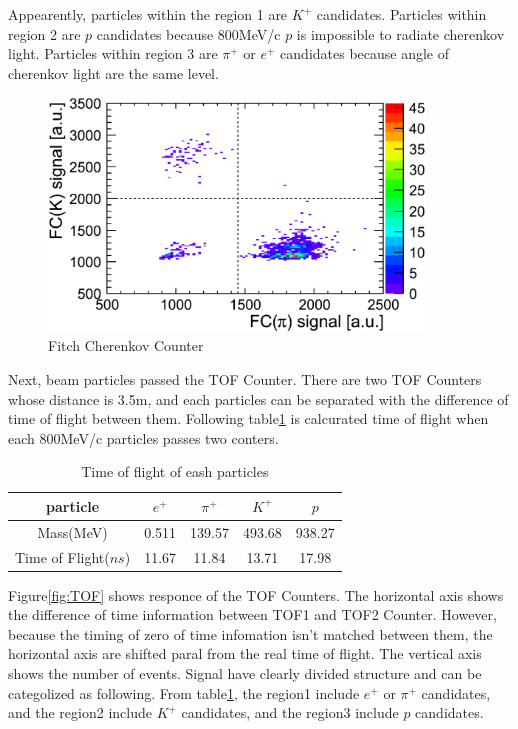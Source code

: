 Appearently, particles within the region 1 are $K^{+}$ candidates.
Particles within region 2 are $p$ candidates because 800MeV/c $p$ is impossible to radiate cherenkov light.
Particles within region 3 are $\pi^{+}$ or $e^{+}$ candidates because angle of cherenkov light are the same level.

\begin{figure}[htbp]
  \centering
  \includegraphics[width=10cm,clip]{fig/FC_KPI.eps}
  \caption{Fitch Cherenkov Counter}
  \label{fig:FC_KPI}
\end{figure}

Next, beam particles passed the TOF Counter.
There are two TOF Counters whose distance is 3.5m, 
and each particles can be separated with the difference of time of flight between them.
Following table\ref{tb:TOF_expect} is calcurated time of flight when each 800MeV/c particles passes two conters.\\

\begin{table}
  \centering
  \begin{tabular}[htb]{c|cccc}\hline
    particle & $e^{+}$ & $\pi^{+}$ & $K^{+}$ & $p$ \\ \hline
    Mass(MeV) & 0.511 & 139.57 & 493.68 & 938.27 \\
    Time of Flight($ns$) & 11.67 & 11.84 & 13.71 & 17.98 \\ \hline
  \end{tabular}
  \caption{Time of flight of eash particles}
  \label{tb:TOF_expect}
\end{table}

Figure\ref{fig:TOF} shows responce of the TOF Counters.
The horizontal axis shows the difference of time information between TOF1 and TOF2 Counter.
However, because the timing of zero of time infomation isn't matched between them, 
the horizontal axis are shifted paral from the real time of flight.
The vertical axis shows the number of events.
Signal have clearly divided structure and can be categolized as following.
From table\ref{tb:TOF_expect}, the region1 include $e^{+}$ or $\pi^{+}$ candidates,
and the region2 include $K^{+}$ candidates, and the region3 include $p$ candidates.\\

